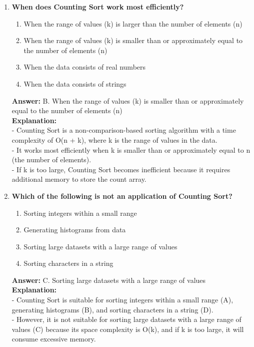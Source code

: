 \begin{enumerate}
    \item \textbf{When does Counting Sort work most efficiently?}
    \begin{enumerate}
        \item When the range of values (k) is larger than the number of elements (n)
        \item When the range of values (k) is smaller than or approximately equal to the number of elements (n)
        \item When the data consists of real numbers
        \item When the data consists of strings
    \end{enumerate}
    \textbf{Answer:} B. When the range of values (k) is smaller than or approximately equal to the number of elements (n) \\
    \textbf{Explanation:} \\
    - Counting Sort is a non-comparison-based sorting algorithm with a time complexity of O(n + k), where k is the range of values in the data. \\
    - It works most efficiently when k is smaller than or approximately equal to n (the number of elements). \\
    - If k is too large, Counting Sort becomes inefficient because it requires additional memory to store the count array.
    
    \item \textbf{Which of the following is not an application of Counting Sort?}
    \begin{enumerate}
        \item Sorting integers within a small range
        \item Generating histograms from data
        \item Sorting large datasets with a large range of values
        \item Sorting characters in a string
    \end{enumerate}
    \textbf{Answer:} C. Sorting large datasets with a large range of values \\
    \textbf{Explanation:} \\
    - Counting Sort is suitable for sorting integers within a small range (A), generating histograms (B), and sorting characters in a string (D). \\
    - However, it is not suitable for sorting large datasets with a large range of values (C) because its space complexity is O(k), and if k is too large, it will consume excessive memory.
    

\end{enumerate}
